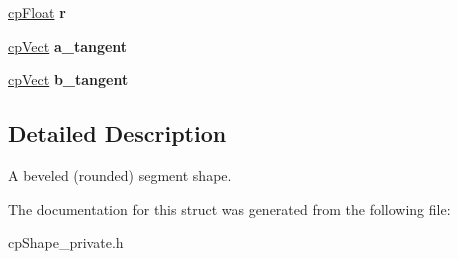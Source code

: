 \begin{DoxyCompactItemize}
\item 
\hypertarget{structcp_segment_shape_a2db5751e3e61d439a73aad029e568a05}{}\hyperlink{group__basic_types_gac1ed65573e035bf892505768c852d8d3}{cp\+Float} {\bfseries r}\label{structcp_segment_shape_a2db5751e3e61d439a73aad029e568a05}

\item 
\hypertarget{structcp_segment_shape_a3ba1032e0a8842a0a0eda12e42cb710f}{}\hyperlink{structcp_vect}{cp\+Vect} {\bfseries a\+\_\+tangent}\label{structcp_segment_shape_a3ba1032e0a8842a0a0eda12e42cb710f}

\item 
\hypertarget{structcp_segment_shape_aed400f79a3b1fa176382bb2912b7a0d7}{}\hyperlink{structcp_vect}{cp\+Vect} {\bfseries b\+\_\+tangent}\label{structcp_segment_shape_aed400f79a3b1fa176382bb2912b7a0d7}

\end{DoxyCompactItemize}


\subsection{Detailed Description}
A beveled (rounded) segment shape. 

The documentation for this struct was generated from the following file\+:\begin{DoxyCompactItemize}
\item 
cp\+Shape\+\_\+private.\+h\end{DoxyCompactItemize}
